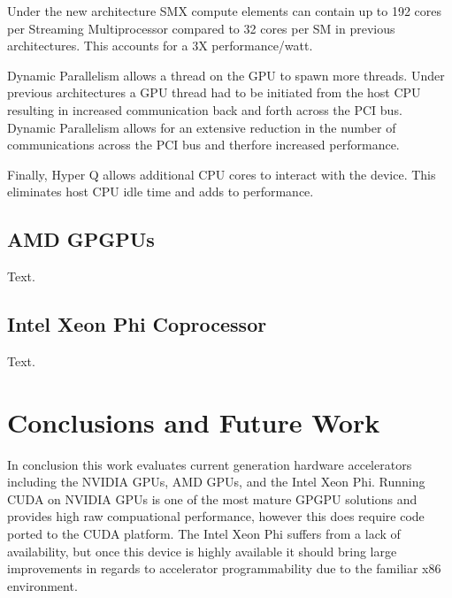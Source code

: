 \documentclass[conference]{IEEEtran}
\begin{document}
Under the new architecture SMX compute elements can contain up to 192 cores per Streaming Multiprocessor compared to 32 cores per SM in previous architectures. This accounts for a 3X performance/watt.

Dynamic Parallelism allows a thread on the GPU to spawn more threads. Under previous architectures a GPU thread had to be initiated from the host CPU resulting in increased communication back and forth across the PCI bus. Dynamic Parallelism allows for an extensive reduction in the number of communications across the PCI bus and therfore increased performance.

Finally, Hyper Q allows additional CPU cores to interact with the device. This eliminates host CPU idle time and adds to performance.

\subsection{AMD GPGPUs}
Text.\cite{AMD_web}

\subsection{Intel Xeon Phi Coprocessor}
Text.\cite{Xeon_Phi_web}

\section{Conclusions and Future Work}
In conclusion this work evaluates current generation hardware accelerators including the NVIDIA GPUs, AMD GPUs, and the Intel Xeon Phi. Running CUDA on NVIDIA GPUs is one of the most mature GPGPU solutions and provides high raw compuational performance, however this does require code ported to the CUDA platform. The Intel Xeon Phi suffers from a lack of availability, but once this device is highly available it should bring large improvements in regards to accelerator programmability due to the familiar x86 environment.



\end{document}
